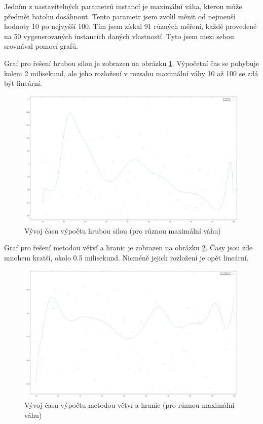 \documentclass[12pt,a4paper]{article}
\begin{document}
Jedním z nastavitelných parametrů instancí je maximální váha, kterou může předmět batohu dosáhnout. Tento parametr jsem zvolil měnit od nejmenší hodnoty 10 po nejvyšší 100. Tím jsem získal 91 různých měření, každé provedené na 50 vygenerovaných instancích daných vlastností. Tyto jsem mezi sebou srovnával pomocí grafů.

Graf pro řešení hrubou silou je zobrazen na obrázku \ref{maxWeight/BruteForce}. Výpočetní čas se pohybuje kolem 2 milisekund, ale jeho rozložení v rozsahu maximální váhy 10 až 100 se zdá být lineární.

\begin{figure}[H]
\begin{center}
\includegraphics[width=\textwidth]{maxWeight/BruteForce}
\caption{Vývoj času výpočtu hrubou silou (pro různou maximální váhu)}
\label{maxWeight/BruteForce}
\end{center}
\end{figure}

Graf pro řešení metodou větví a hranic je zobrazen na obrázku \ref{maxWeight/BranchNBound}. Časy jsou zde mnohem kratší, okolo 0.5 milisekund. Nicméně jejich rozložení je opět lineární.

\begin{figure}[H]
\begin{center}
\includegraphics[width=\textwidth]{maxWeight/BranchNBound}
\caption{Vývoj času výpočtu metodou větví a hranic (pro různou maximální váhu)}
\label{maxWeight/BranchNBound}
\end{center}
\end{figure}
\end{document}
